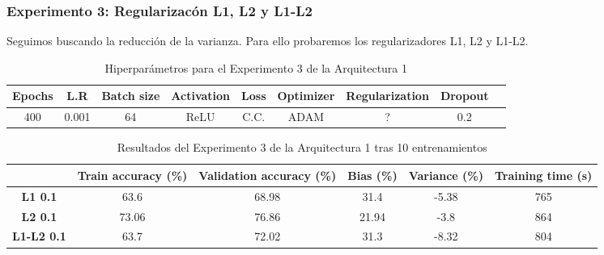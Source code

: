 \documentclass{article}
\begin{document}
        \subsubsection{Experimento 3: Regularizac\'on L1, L2 y L1-L2 }
        Seguimos buscando la reducci\'on de la varianza. Para ello probaremos los regularizadores L1, L2 y L1-L2. 
        \begin{table}[!h]
				\begin{tabular}{|c|c|c|c|c|c|c|c|c|}
					\textbf{Epochs}&\textbf{L.R}&\textbf{Batch size}&\textbf{Activation}&\textbf{Loss}&\textbf{Optimizer}&\textbf{Regularization}&\textbf{Dropout}   \\ \hline
					400 & 0.001 & 64 & ReLU & C.C. & ADAM & ? & 0.2 
				\end{tabular}
				\caption{Hiperpar\'ametros para el Experimento 3 de la Arquitectura 1}
				\label{tab:hip-a6-e3}
		\end{table}

		\begin{table}[!h]
				\begin{center}
					\begin{tabular}{ c | c | c | c | c | c |}
						\ & \textbf{Train accuracy (\%)} & \textbf{Validation accuracy (\%)} & \textbf{Bias (\%)} & \textbf{Variance (\%)} & \textbf{Training time (s)} \\ \hline
						\textbf{L1 0.1} &63.6   &68.98  & 31.4  & -5.38 &  765 \\ \hline
						\textbf{L2 0.1} & 73.06   & 76.86 &  21.94 & -3.8 &864   \\ \hline
                        \textbf{L1-L2 0.1} &  63.7  &72.02 &  31.3 & -8.32 &804   \\ \hline
					\end{tabular}
					\caption{Resultados del Experimento 3 de la Arquitectura 1 tras 10 entrenamientos}
					\label{tab:res-a2-e3}
				\end{center}
			\end{table}
   
\end{document}
